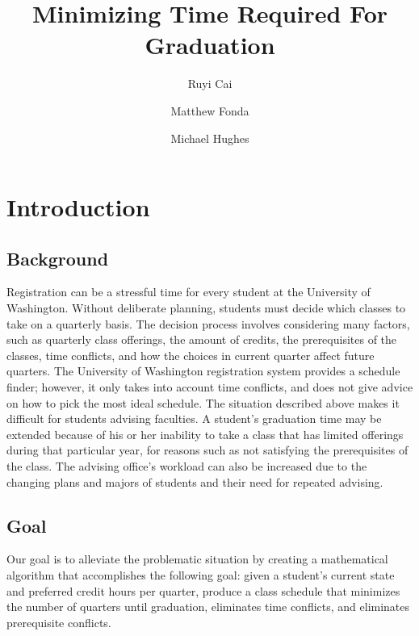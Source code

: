 \documentclass[11pt]{article} %
\title{Minimizing Time Required For Graduation}
\author{Ruyi Cai \and Matthew Fonda \and Michael Hughes}
\begin{document}
\maketitle

\tableofcontents
\pagebreak




\section{Introduction} \subsection{Background} Registration can be a stressful
time for every student at the University of Washington. Without deliberate
planning, students must decide which classes to take on a quarterly basis. The
decision process involves considering many factors, such as quarterly class
offerings, the amount of credits, the prerequisites of the classes, time
conflicts, and how the choices in current quarter affect future quarters. The
University of Washington registration system provides a schedule finder;
however, it only takes into account time conflicts, and does not give advice on
how to pick the most ideal schedule. The situation described above makes it
difficult for students advising faculties. A student's graduation time may be
extended because of his or her inability to take a class that has limited
offerings during that particular year, for reasons such as not satisfying the
prerequisites of the class. The advising office’s workload can also be increased
due to the changing plans and majors of students and their need for repeated
advising. 

\subsection{Goal} Our goal is to alleviate the problematic situation by creating
a mathematical algorithm that accomplishes the following goal: given a student's
current state and preferred credit hours per quarter, produce a class schedule
that minimizes the number of quarters until graduation, eliminates time
conflicts, and eliminates prerequisite conflicts. 
\end{document}
